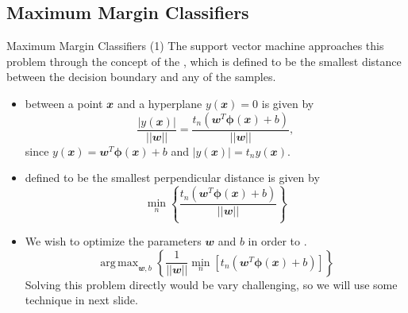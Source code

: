 \documentclass{bredelebeamer}
\DeclareMathOperator*{\argmax}{arg\,max}
\begin{document}
\subsection{Maximum Margin Classifiers}
\begin{frame}{Maximum Margin Classifiers (1)}
  The support vector machine approaches this problem through the concept of the
  , which is defined to be the smallest distance between the
  decision boundary and any of the samples.
  \begin{itemize}
    \item {} between a point $\mathbfit{x}$ and a hyperplane
    $y(\mathbfit{x}) = 0$ is given by
    \begin{equation}
      \frac{|y(\mathbfit{x})|}{||\mathbfit{w}||}
      = \frac{t_n (\mathbfit{w}^T \boldsymbol{\phi} (\mathbfit{x}) + b)}{||\mathbfit{w}||},
    \end{equation}
    since $y(\mathbfit{x}) = \mathbfit{w}^T \boldsymbol{\phi} (\mathbfit{x}) + b$ and
    $|y(\mathbfit{x})| = t_n y(\mathbfit{x})$.
    \item {} defined to be the smallest perpendicular distance is given  by
    \begin{equation}
      \min_{n}
        \left\{
          \frac{t_n (\mathbfit{w}^T \boldsymbol{\phi} (\mathbfit{x}) + b)}{||\mathbfit{w}||}
        \right\}
    \end{equation}
    \item We wish to optimize the parameters $\mathbfit{w}$ and $b$ in order to
    .
    \begin{equation}
      \argmax_{\mathbfit{w}, b}
      \left\{
        \frac{1}{||\mathbfit{w}||} \min_{n}
          \left[
            t_n (\mathbfit{w}^T \boldsymbol{\phi} (\mathbfit{x}) + b)
          \right]
      \right\}
    \end{equation}
    Solving this problem directly would be vary challenging, so we will use some
    technique in next slide.
  \end{itemize}
\end{frame}
\end{document}
